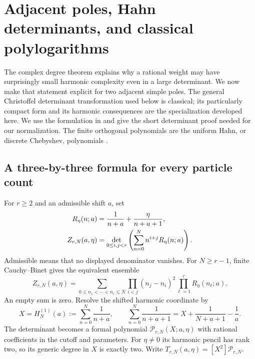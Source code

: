 \section{Adjacent poles, Hahn determinants, and classical polylogarithms}
\label{hp:section}

The complex degree theorem explains why a rational weight may have
surprisingly small harmonic complexity even in a large determinant.
We now make that statement explicit for two adjacent simple poles.
The general Christoffel determinant transformation used below is
classical; its particularly compact form and its harmonic consequences
are the specialization developed here. We use the formulation in
\cite{Krattenthaler2023} and give the short determinant proof needed
for our normalization. The finite orthogonal polynomials are the
uniform Hahn, or discrete Chebyshev, polynomials
\cite[Sections 18.19--18.20]{DLMF}.

\subsection{A three-by-three formula for every particle count}

For $r\ge2$ and an admissible shift $a$, set
\begin{align}
 R_\eta(n;a)&=\frac1{n+a}+\frac{\eta}{n+a+1},\notag\\
 Z_{r,N}(a,\eta)
 &=\det_{0\le i,j<r}
       \left(\sum_{n=0}^N n^{i+j}R_\eta(n;a)\right).
 \label{hp:ensemble}
\end{align}
Admissible means that no displayed denominator vanishes. For
$N\ge r-1$, finite Cauchy--Binet gives the equivalent ensemble
\begin{equation}\label{hp:vandermonde}
 Z_{r,N}(a,\eta)=
 \sum_{0\le n_1<\cdots<n_r\le N}
       \prod_{i<j}(n_j-n_i)^2\prod_{\ell=1}^rR_\eta(n_\ell;a).
\end{equation}
An empty sum is zero. Resolve the shifted harmonic coordinate by
\[
 X=H_N^{(1)}(a):=\sum_{n=0}^N\frac1{n+a},
 \qquad
 \sum_{n=0}^N\frac1{n+a+1}
 =X+\frac1{N+a+1}-\frac1a.
\]
The determinant becomes a formal polynomial
$\mathcal P_{r,N}(X;a,\eta)$ with rational coefficients in the
cutoff and parameters. For $\eta\ne0$ its harmonic pencil has rank
two, so its generic degree in $X$ is exactly two. Write
$T_{r,N}(a,\eta)=[X^2]\mathcal P_{r,N}$.


